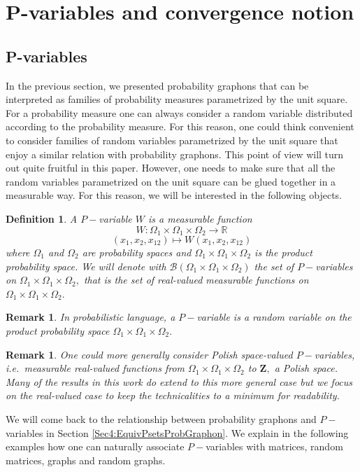 \documentclass[11pt]{article}
\newtheorem{definition}[theorem]{Definition}
\newtheorem{remark}[theorem]{Remark}
\def\R{\mathbb{R}}
\newcommand{\cB}{{\mathcal B}}  %
\newcommand{\cP}{{\mathcal P}}  %
\newcommand{\Space}{\mathbf{Z}}
\begin{document}
\section{P-variables and convergence notion}\label{Sec3Psets}
\subsection{P-variables}

In the previous section, we presented probability graphons that can be interpreted as families of probability measures parametrized by the unit square. For a probability measure one can always consider a random variable distributed according to the probability measure. For this reason, one could think convenient to consider families of random variables parametrized by the unit square that enjoy a similar relation with probability graphons. This point of view will turn out quite fruitful in this paper. However, one needs to make sure that all the random variables parametrized on the unit square can be glued together in a measurable way. For this reason, we will be interested in the following objects.         

\begin{definition}
    A $P-$\emph{variable} $W$ is a measurable function $$W:\Omega_1\times \Omega_1 \times \Omega_2\rightarrow \R$$
    $$(x_1,x_2,x_{12})\mapsto W(x_1,x_2,x_{12})$$
    where $\Omega_1$ and $\Omega_2$ are probability spaces and $\Omega_1\times \Omega_1 \times \Omega_2$ is the product probability space.
    We will denote with $\mathcal{B}(\Omega_1\times \Omega_1 \times \Omega_2)$ the set of $P-$variables on $\Omega_1\times \Omega_1 \times \Omega_2,$ that is the set of real-valued measurable functions on $\Omega_1\times \Omega_1 \times \Omega_2.$ %
    \end{definition}
\begin{remark}
In probabilistic language, a $P-$variable is a random variable on the product probability space $\Omega_1\times \Omega_1 \times \Omega_2.$   
\end{remark}

\begin{remark}
One could more generally consider Polish space-valued $P-$variables, i.e.\ measurable real-valued functions from $\Omega_1\times \Omega_1 \times \Omega_2$ to $\Space,$ a Polish space. Many of the results in this work do extend to this more general case but we focus on the real-valued case to keep the technicalities to a minimum for readability. 
\end{remark}
We will come back to the relationship between probability graphons and $P-$variables in Section \ref{Sec4:EquivPsetsProbGraphon}. We explain in the following examples how one can naturally associate $P-$variables with matrices, random matrices, graphs and random graphs.
\end{document}

